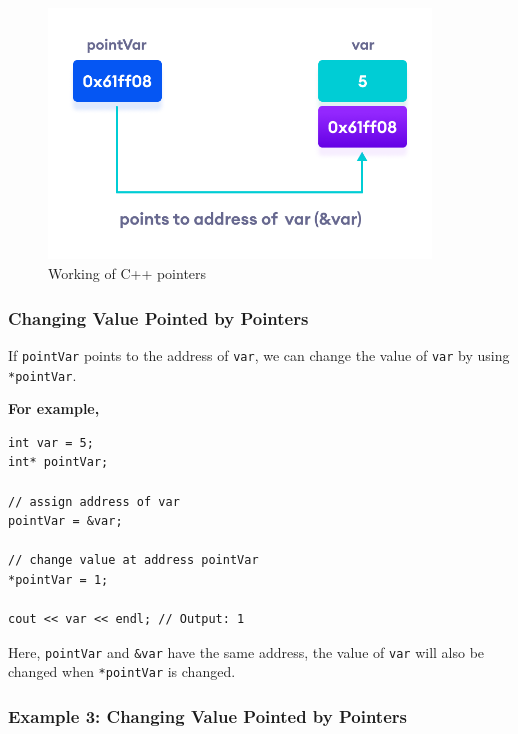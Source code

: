 \begin{figure}
\centering
\includegraphics[width=4in]{images/cpp-pointer-working.png}
\caption{Working of C++ pointers}
\end{figure}

\doublelinewithspace{.0cm}

\hypertarget{changing-value}{%
\subsubsection{Changing Value Pointed by Pointers}\label{changing-value}}

If \texttt{pointVar} points to the address of \texttt{var}, we can
change the value of \texttt{var} by using \texttt{*pointVar}.

\textbf{For example,}
\begin{verbatim}
int var = 5;
int* pointVar;

// assign address of var
pointVar = &var;

// change value at address pointVar
*pointVar = 1;

cout << var << endl; // Output: 1
\end{verbatim}

Here, \texttt{pointVar} and \texttt{\&var} have the same address, the
value of \texttt{var} will also be changed when \texttt{*pointVar} is
changed.

\doublelinewithspace{.0cm}

\hypertarget{example3}{%
\subsubsection{Example 3: Changing Value Pointed by
Pointers}\label{example3}}

